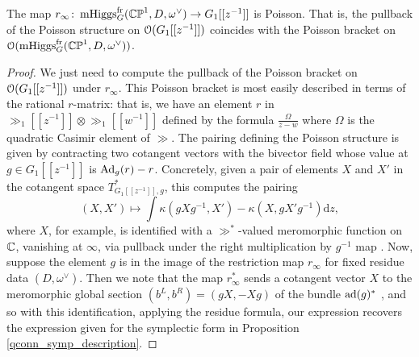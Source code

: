 \documentclass[10pt, oneside]{article}
\DeclareMathOperator{\mhiggs}{mHiggs}
\renewcommand{\d}{\mathrm{d}}
\newcommand{\fr}{\mathrm{fr}}
\renewcommand{\ad}{\mr{ad}}
\newcommand{\Ad}{\mr{Ad}}
\begin{document}
\begin{theorem} \label{Poisson_Lie_Comparison_thm}
The map $r_\infty \colon \mhiggs^\fr_G(\bb{CP}^1,D,\omega^\vee) \to G_1[[z^{-1}]]$ is Poisson.  That is, the pullback of the Poisson structure on $\mathcal{O}(G_1[[z^{-1}]])$ coincides with the Poisson bracket on $\OO(\mhiggs^\fr_G(\bb{CP}^1,D,\omega^\vee))$. 
\end{theorem}

\begin{proof}
We just need to compute the pullback of the Poisson bracket on $\mathcal{O}(G_1[[z^{-1}]])$ under $r_\infty$.  This Poisson bracket is most easily described in terms of the rational $r$-matrix: that is, we have an element $r$ in $\gg_1[[z^{-1}]] \otimes \gg_1[[w^{-1}]]$ defined by the formula $\frac \Omega {z-w}$ where $\Omega$ is the quadratic Casimir element of $\gg$.  The pairing defining the Poisson structure is given by contracting two cotangent vectors with the bivector field whose value at $g \in G_1[[z^{-1}]]$ is $\Ad_g(r) - r$.  Concretely, given a pair of elements $X$ and $X'$ in the cotangent space $T^*_{G_1[[z^{-1}]], g}$, this computes the pairing
\[(X, X') \mapsto \int \kappa(g X g^{-1},X') - \kappa(X, g X' g^{-1})\d z,\]
where $X$, for example, is identified with a $\gg^*$-valued meromorphic function on $\mathbb{C}$, vanishing at $\infty$, via pullback under the right multiplication by $g^{-1}$ map .  Now, suppose the element $g$ is in the image of the restriction map $r_\infty$ for fixed residue data $(D,\omega^\vee)$.  Then we note that the map $r_\infty^*$ sends a cotangent vector $X$ to the meromorphic global section $(b^L, b^R) = (gX, -Xg)$ of the bundle $\ad(g)^*$ , and so with this identification, applying the residue formula, our expression recovers the expression given for the symplectic form in Proposition \ref{qconn_symp_description}. 
\end{proof}
\end{document}
